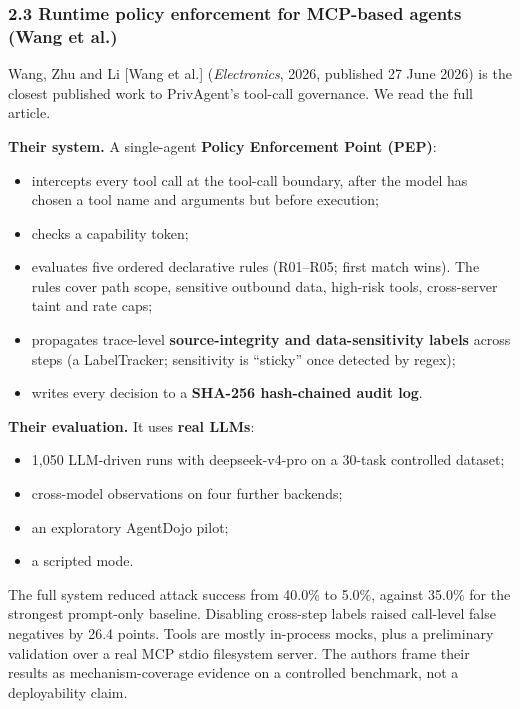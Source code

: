 \documentclass[10pt]{article}
\begin{document}
\subsubsection*{2.3 Runtime policy enforcement for MCP-based agents (Wang et al.)}

Wang, Zhu and Li [Wang et al.] (\emph{Electronics}, 2026, published 27 June 2026) is the closest published work to PrivAgent's tool-call governance. We read the full article.

\textbf{Their system.} A single-agent \textbf{Policy Enforcement Point (PEP)}:

\begin{itemize}
\item intercepts every tool call at the tool-call boundary, after the model has chosen a tool name and arguments but before execution;
\item checks a capability token;
\item evaluates five ordered declarative rules (R01--R05; first match wins). The rules cover path scope, sensitive outbound data, high-risk tools, cross-server taint and rate caps;
\item propagates trace-level \textbf{source-integrity and data-sensitivity labels} across steps (a LabelTracker; sensitivity is ``sticky'' once detected by regex);
\item writes every decision to a \textbf{SHA-256 hash-chained audit log}.
\end{itemize}

\textbf{Their evaluation.} It uses \textbf{real LLMs}:

\begin{itemize}
\item 1,050 LLM-driven runs with deepseek-v4-pro on a 30-task controlled dataset;
\item cross-model observations on four further backends;
\item an exploratory AgentDojo pilot;
\item a scripted mode.
\end{itemize}

The full system reduced attack success from 40.0\% to 5.0\%, against 35.0\% for the strongest prompt-only baseline. Disabling cross-step labels raised call-level false negatives by 26.4 points. Tools are mostly in-process mocks, plus a preliminary validation over a real MCP stdio filesystem server. The authors frame their results as mechanism-coverage evidence on a controlled benchmark, not a deployability claim.
\end{document}
